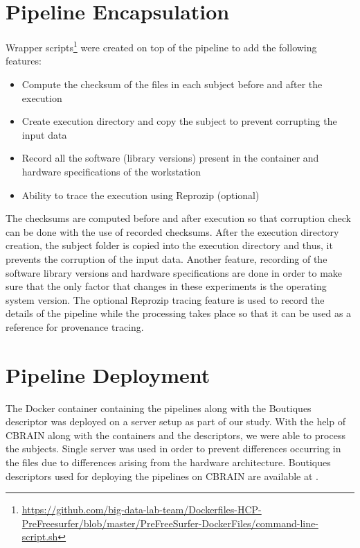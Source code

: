 \section{Pipeline Encapsulation}\label{encapsulation}
Wrapper scripts\footnote{\url{https://github.com/big-data-lab-team/Dockerfiles-HCP-PreFreesurfer/blob/master/PreFreeSurfer-DockerFiles/command-line-script.sh}} were created on top of the pipeline to add the following features:
\begin{itemize}
  \item Compute the checksum of the files in each subject before and after the execution
  \item Create execution directory and copy the subject to prevent corrupting the input data
  \item Record all the software (library versions) present in the container and hardware specifications of the workstation
  \item Ability to trace the execution using Reprozip (optional)
\end{itemize}

The checksums are computed before and after execution so that corruption check can be done with the use of recorded checksums. After the execution directory creation, the subject folder is copied into the execution directory and thus, it prevents the corruption of the input data. Another feature, recording of the software library versions and hardware specifications are done in order to make sure that the only factor that changes in these experiments is the operating system version. The optional Reprozip tracing feature is used to record the details of the pipeline while the processing takes place so that it can be used as a reference for provenance tracing.

\section{Pipeline Deployment}\label{deployment}
The Docker container containing the pipelines along with the Boutiques descriptor was deployed on a server setup as part of our study. With the help of CBRAIN along with the containers and the descriptors, we were able to process the subjects. Single server was used in order to prevent differences occurring in the files due to differences arising from the hardware architecture. Boutiques descriptors used for deploying the pipelines on CBRAIN are available at \cite{HCP_descriptors}.


